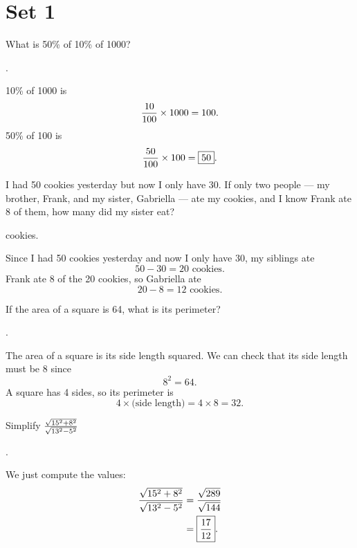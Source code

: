 \documentclass[11pt]{article}
\DeclareRobustCommand{\frac}[3][0pt]{%
  {\begingroup\hspace{#1}#2\hspace{#1}\endgroup\over\hspace{#1}#3\hspace{#1}}}
\begin{document}


\section*{Set 1}

\begin{problem}
What is 50\% of 10\% of 1000?
\end{problem}
\begin{answer}
.
\end{answer}
\begin{solution}
10\% of 1000 is
$$\frac{10}{100} \times 1000 = 100.$$
50\% of 100 is
$$\frac{50}{100} \times 100 = \boxed{50}.$$
\end{solution}

\begin{problem}
I had 50 cookies yesterday but now I only have 30. If only two people --- my brother, Frank, and my sister, Gabriella --- ate my cookies, and I know Frank ate 8 of them, how many did my sister eat?
\end{problem}
\begin{answer}
 cookies.
\end{answer}
\begin{solution}
Since I had 50 cookies yesterday and now I only have 30, my siblings ate
$$50-30 = 20 \text{ cookies}.$$
Frank ate 8 of the 20 cookies, so Gabriella ate
$$20-8=\boxed{12} \text{ cookies}.$$
\end{solution}

\begin{problem}
If the area of a square is 64, what is its perimeter?
\end{problem}
\begin{answer}
.
\end{answer}
\begin{solution}
The area of a square is its side length squared. We can check that its side length must be 8 since
$$8^2 = 64.$$
A square has 4 sides, so its perimeter is
$$4 \times \text{(side length)} = 4 \times 8 = \boxed{32}.$$
\end{solution}


\begin{problem}
Simplify $\frac{\sqrt{15^2+8^2}}{\sqrt{13^2-5^2}}$
\end{problem}
\begin{answer}
 \boxed{\frac{17}{12}}.
\end{answer}
\begin{solution}
We just compute the values:
\begin{align*}
\frac{\sqrt{15^2+8^2}}{\sqrt{13^2-5^2}} &= \frac{\sqrt{289}}{\sqrt{144}} \\
                    	&= \boxed{\frac{17}{12}}.
\end{align*}
\end{solution}
\end{document}
